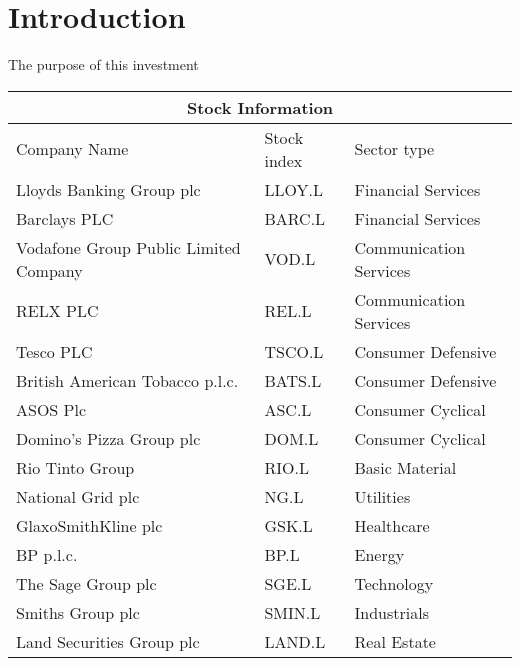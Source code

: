 
\section{Introduction}

The purpose of this investment \\

\setlength{\arrayrulewidth}{0.6mm}
\setlength{\tabcolsep}{20pt}
\renewcommand{\arraystretch}{2}


\begin{center}
\begin{tabular}{ |p{6cm}|p{2.5cm}|p{4.5cm}| }
\hline
\multicolumn{3}{|c|}{Stock Information} \\

\hline
Company Name& Stock index & Sector type \\
\hline
Lloyds Banking Group plc & LLOY.L & Financial Services  \\
\hline
Barclays PLC & BARC.L & Financial Services \\
\hline
Vodafone Group Public Limited Company & VOD.L & Communication Services \\
\hline
RELX PLC & REL.L & Communication Services \\
\hline
Tesco PLC & TSCO.L & Consumer Defensive \\
\hline
British American Tobacco p.l.c. & BATS.L & Consumer Defensive \\
\hline
ASOS Plc & ASC.L & Consumer Cyclical \\
\hline
Domino's Pizza Group plc & DOM.L & Consumer Cyclical \\
\hline
Rio Tinto Group & RIO.L & Basic Material \\
\hline
National Grid plc & NG.L & Utilities \\
\hline
GlaxoSmithKline plc & GSK.L & Healthcare \\
\hline
BP p.l.c. & BP.L & Energy \\
\hline
The Sage Group plc & SGE.L & Technology \\
\hline
Smiths Group plc & SMIN.L & Industrials \\
\hline
Land Securities Group plc & LAND.L & Real Estate \\
\hline
\end{tabular}
\end{center}



\newpage